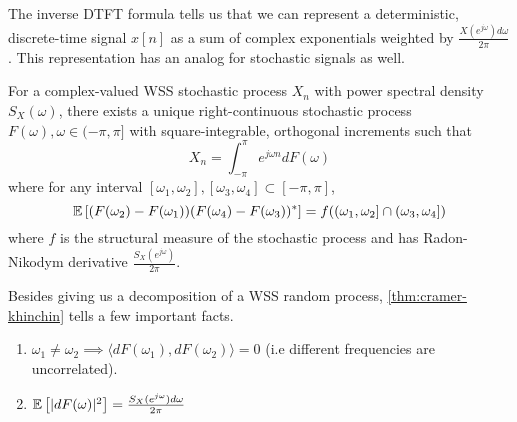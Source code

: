 The inverse DTFT formula tells us that we can represent a deterministic, discrete-time signal $x[n]$ as a sum of complex exponentials weighted by $\frac{X(e^{j\omega})d\omega}{2\pi}$.
This representation has an analog for stochastic signals as well.
\begin{theorem}
	For a complex-valued WSS stochastic process $X_n$ with power spectral density $S_X(\omega)$, there exists a unique right-continuous stochastic process $F(\omega), \omega\in(-\pi,\pi]$ with square-integrable, orthogonal increments such that \[
		X_n = \int_{-\pi}^{\pi}e^{j\omega n}dF(\omega)
	\] where for any interval $[\omega_1,\omega_2], [\omega_3, \omega_4]\subset [-\pi,\pi]$, \[
		\mathbb{E}\left[(F(\omega_2)-F(\omega_1))(F(\omega_4) - F(\omega_3))^*\right] = f((\omega_1,\omega_2] \cap (\omega_3, \omega_4])
	\] where $f$ is the structural measure of the stochastic process and has Radon-Nikodym derivative $\frac{S_X(e^{j\omega})}{2\pi}$.
	\label{thm:cramer-khinchin}
\end{theorem}
Besides giving us a decomposition of a WSS random process, \cref{thm:cramer-khinchin} tells a few important facts.
\begin{enumerate}
	\item $\omega_1\neq\omega_2 \implies \langle dF(\omega_1), dF(\omega_2) \rangle = 0$ (i.e different frequencies are uncorrelated).
	\item $\mathbb{E}\left[|dF(\omega)|^2\right] = \frac{S_X(e^{j\omega})d\omega}{2\pi}$
\end{enumerate}
